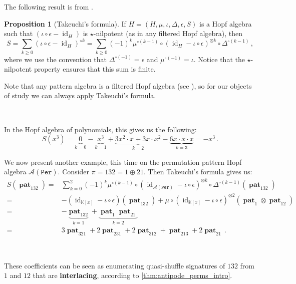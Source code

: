 \documentclass[12pt, reqno]{amsart}
\theoremstyle{definition}
\newtheorem{prop}[thm]{Proposition}
\DeclareMathOperator{\id}{id}
\DeclareMathOperator{\pat}{\mathbf{pat}}
\begin{document}
The following result is from \cite[Lemma 14]{Takeuchi1971}.

\begin{prop}[Takeuchi's formula]\label{lm:takeuchi}
If $H = (H, \mu, \iota, \Delta, \epsilon, S)$ is a Hopf algebra such that $(\iota\circ \epsilon - \id_H)$ is $\star$-nilpotent (as in any filtered Hopf algebra), then 
\begin{equation}\label{eq:eq1}
S = \sum_{k\geq 0 }  ( \iota  \circ\epsilon- \id_H)^{\star k} = \sum_{k\geq 0} (-1)^k \mu^{\circ (k-1)} \circ (\id_{H} - \iota \circ \epsilon)^{\otimes k} \circ \Delta^{\circ (k-1)}\, ,
\end{equation}
where we use the convention that $\Delta^{\circ (-1)} = \epsilon $ and $\mu^{\circ (-1)} = \iota$.
Notice that the $\star$-nilpotent property ensures that this sum is finite.
\end{prop}

Note that any pattern algebra is a filtered Hopf algebra (see \cite[Theorem A.2.4]{penaguiao2020algebraic}), so for our objects of study we can always apply Takeuchi's formula.

\

In the Hopf algebra of polynomials, this gives us the following:
$$S(x^3) = \underbrace{0}_{k = 0} - \underbrace{x^3}_{k = 1} + \underbrace{3 x^2 \cdot x + 3 x \cdot x^2}_{k=2} - \underbrace{6 x \cdot x \cdot x}_{k = 3} = - x^3 \, .$$


We now present another example, this time on the permutation pattern Hopf algebra $\mathcal A(\mathtt{Per})$.
Consider $\pi = 132 = 1 \oplus 21$. Then Takeuchi's formula gives us:
\begin{align*}
S(\pat_{132}) =& \sum_{k=0}^2 (-1)^k \mu^{\circ (k-1)} \circ (\id_{\mathcal A(\mathtt{Per})} - \iota \circ \epsilon)^{\otimes k} \circ \Delta^{\circ (k-1)}(\pat_{132})\\
=& -(\id_{\mathbb{K}[x]} - \iota \circ \epsilon)(\pat_{132}) + \mu \circ (\id_{\mathbb{K}[x]} - \iota\circ\epsilon)^{\otimes 2}(\pat_1 \otimes \pat_{12}) \\
=& - \underbrace{\pat_{132}}_{k=1} + \underbrace{\pat_1 \pat_{21}}_{k=2} \\
=& 3 \pat_{321} + 2 \pat_{231} + 2 \pat_{312} + \pat_{213} + 2 \pat_{21} \, .
\end{align*}

\

These coefficients can be seen as enumerating quasi-shuffle signatures of $132$ from $1$ and $12$ that are \textbf{interlacing}, according to \cref{thm:antipode_perms_intro}.
\end{document}
